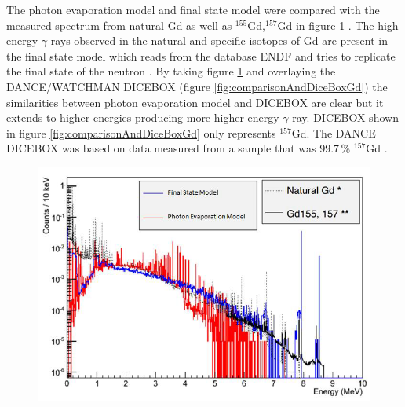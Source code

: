 The photon evaporation model and final state model were compared with the measured spectrum from natural Gd as well as $^{155}$Gd,$^{157}$Gd in figure \ref{fig:comparisonGd} \cite{YuChen_2015}. The high energy $\gamma$-rays observed in the natural and specific isotopes of Gd are present in the final state model which reads from the database ENDF \cite{BROWN20181} and tries to replicate the final state of the neutron \cite{koiTatsumi_2006}. By taking figure \ref{fig:comparisonGd} and overlaying the DANCE/WATCHMAN DICEBOX (figure \ref{fig:comparisonAndDiceBoxGd}) the similarities between photon evaporation model and DICEBOX are clear but it extends to higher energies producing more higher energy $\gamma$-ray. DICEBOX shown in figure \ref{fig:comparisonAndDiceBoxGd} only represents $^{157}$Gd. The DANCE DICEBOX was based on data measured from a sample that was  99.7\,\% $^{157}$Gd \cite{Chyzh_2011}. 

\begin{figure}[!h]
 \centering
 \includegraphics[width=0.7\linewidth]{Chapter4/Figs/Raster/gadolinium/comparisonGd.png}
 \label{fig:comparisonGd}
\end{figure}

